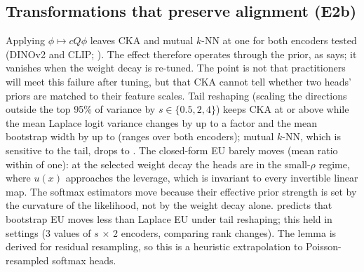 \documentclass[twoside]{article}
\theoremstyle{definition}
\theoremstyle{remark}
\begin{document}


\subsection{Transformations that preserve alignment (E2b)}
\label{sec:e2b}

Applying $\phi\mapsto cQ\phi$ leaves CKA and mutual $k$-NN at one for both encoders tested (DINOv2 and CLIP; ).
\EtwobScaleText{}
The effect therefore operates through the prior, as  says; it vanishes when the weight decay is re-tuned.
The point is not that practitioners will meet this failure after tuning, but that CKA cannot tell whether two heads' priors are matched to their feature scales.
Tail reshaping (scaling the directions outside the top 95\% of variance by $s\in\{0.5,2,4\}$) keeps CKA at or above \EtwobTailCKAMin{} while the mean Laplace logit variance changes by up to a factor \EtwobTailLapMax{} and the mean bootstrap width by up to \EtwobTailWidthMax{} (ranges over both encoders); mutual $k$-NN, which is sensitive to the tail, drops to \EtwobTailMKNNMin{}.
The closed-form EU barely moves (mean ratio within \EtwobTailBLRdev{} of one): at the selected weight decay the heads are in the small-$\rho$ regime, where $u(x)$ approaches the leverage, which is invariant to every invertible linear map.
The softmax estimators move because their effective prior strength is set by the curvature of the likelihood, not by the weight decay alone.
 predicts that bootstrap EU moves less than Laplace EU under tail reshaping; this held in \EtwobBootLessLaplace{} settings (3 values of $s$ $\times$ 2 encoders, comparing rank changes). The lemma is derived for residual resampling, so this is a heuristic extrapolation to Poisson-resampled softmax heads.
\end{document}

